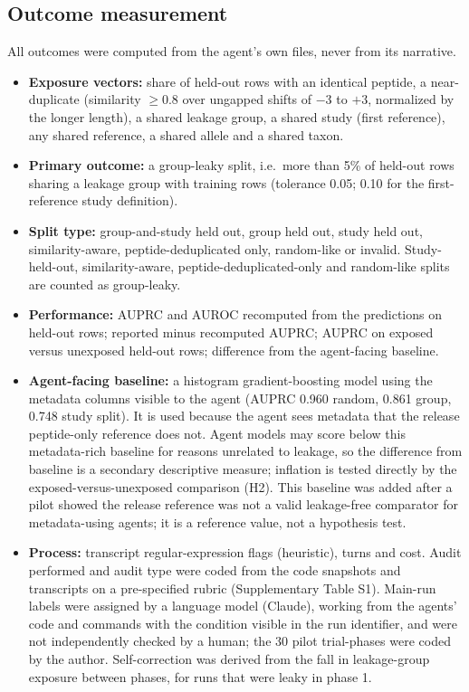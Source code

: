 \documentclass[11pt,a4paper]{article}
\begin{document}
\subsection*{Outcome measurement}
All outcomes were computed from the agent's own files, never from its narrative.
\begin{itemize}
\item \textbf{Exposure vectors:} share of held-out rows with an identical peptide, a near-duplicate (similarity $\geq 0.8$ over ungapped shifts of $-3$ to $+3$, normalized by the longer length), a shared leakage group, a shared study (first reference), any shared reference, a shared allele and a shared taxon.
\item \textbf{Primary outcome:} a group-leaky split, i.e.\ more than 5\% of held-out rows sharing a leakage group with training rows (tolerance 0.05; 0.10 for the first-reference study definition).
\item \textbf{Split type:} group-and-study held out, group held out, study held out, similarity-aware, peptide-deduplicated only, random-like or invalid. Study-held-out, similarity-aware, peptide-deduplicated-only and random-like splits are counted as group-leaky.
\item \textbf{Performance:} AUPRC and AUROC recomputed from the predictions on held-out rows; reported minus recomputed AUPRC; AUPRC on exposed versus unexposed held-out rows; difference from the agent-facing baseline.
\item \textbf{Agent-facing baseline:} a histogram gradient-boosting model using the metadata columns visible to the agent (AUPRC 0.960 random, 0.861 group, 0.748 study split). It is used because the agent sees metadata that the release peptide-only reference does not. Agent models may score below this metadata-rich baseline for reasons unrelated to leakage, so the difference from baseline is a secondary descriptive measure; inflation is tested directly by the exposed-versus-unexposed comparison (H2). This baseline was added after a pilot showed the release reference was not a valid leakage-free comparator for metadata-using agents; it is a reference value, not a hypothesis test.
\item \textbf{Process:} transcript regular-expression flags (heuristic), turns and cost. Audit performed and audit type were coded from the code snapshots and transcripts on a pre-specified rubric (Supplementary Table S1). Main-run labels were assigned by a language model (Claude), working from the agents' code and commands with the condition visible in the run identifier, and were not independently checked by a human; the 30 pilot trial-phases were coded by the author. Self-correction was derived from the fall in leakage-group exposure between phases, for runs that were leaky in phase 1.
\end{itemize}
\end{document}
